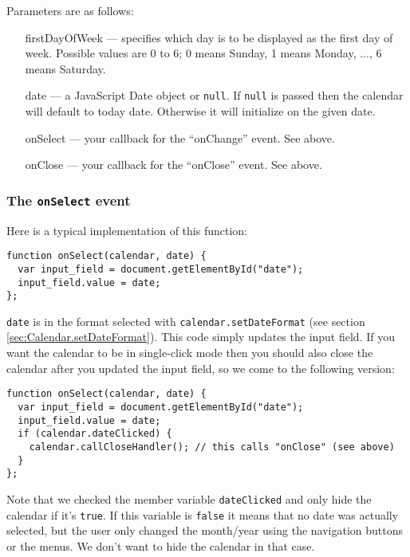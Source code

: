 \documentclass[a4paper,twoside,10pt]{dynadoc}
\begin{document}
Parameters are as follows:

\begin{itemize}

\item [firstDayOfWeek] --- specifies which day is to be displayed as the first
  day of week.  Possible values are 0 to 6; 0 means Sunday, 1 means Monday,
  ..., 6 means Saturday.

\item [date] --- a JavaScript Date object or \texttt{null}.  If \texttt{null}
is passed then the calendar will default to today date.  Otherwise it will
initialize on the given date.

\item [onSelect] --- your callback for the ``onChange'' event.  See above.

\item [onClose] --- your callback for the ``onClose'' event.  See above.

\end{itemize}

\subsubsection*{The \texttt{onSelect} event}\label{sec:Calendar.onSelect}

Here is a typical implementation of this function:

\begin{verbatim}
function onSelect(calendar, date) {
  var input_field = document.getElementById("date");
  input_field.value = date;
};
\end{verbatim}

\noindent \texttt{date} is in the format selected with \texttt{calendar.setDateFormat}
(see section \ref{sec:Calendar.setDateFormat}).  This code simply updates the
input field.  If you want the calendar to be in single-click mode then you
should also close the calendar after you updated the input field, so we come to
the following version:

\begin{verbatim}
function onSelect(calendar, date) {
  var input_field = document.getElementById("date");
  input_field.value = date;
  if (calendar.dateClicked) {
    calendar.callCloseHandler(); // this calls "onClose" (see above)
  }
};
\end{verbatim}

\noindent Note that we checked the member variable \texttt{dateClicked} and
only hide the calendar if it's \texttt{true}.  If this variable is \texttt{false} it
means that no date was actually selected, but the user only changed the
month/year using the navigation buttons or the menus.  We don't want to hide
the calendar in that case.
\end{document}
